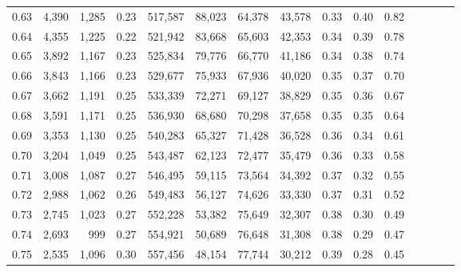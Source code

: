 \begin{tabular}{rrrcrrrrrrrrrrr}
0.63 &   4,390 &   1,285 &                                       0.23 &  517,587 &   88,023 &   64,378 &   43,578 &  0.33 &  0.40 &                         0.82 \\
0.64 &   4,355 &   1,225 &                                       0.22 &  521,942 &   83,668 &   65,603 &   42,353 &  0.34 &  0.39 &                         0.78 \\
0.65 &   3,892 &   1,167 &                                       0.23 &  525,834 &   79,776 &   66,770 &   41,186 &  0.34 &  0.38 &                         0.74 \\
0.66 &   3,843 &   1,166 &                                       0.23 &  529,677 &   75,933 &   67,936 &   40,020 &  0.35 &  0.37 &                         0.70 \\
0.67 &   3,662 &   1,191 &                                       0.25 &  533,339 &   72,271 &   69,127 &   38,829 &  0.35 &  0.36 &                         0.67 \\
0.68 &   3,591 &   1,171 &                                       0.25 &  536,930 &   68,680 &   70,298 &   37,658 &  0.35 &  0.35 &                         0.64 \\
0.69 &   3,353 &   1,130 &                                       0.25 &  540,283 &   65,327 &   71,428 &   36,528 &  0.36 &  0.34 &                         0.61 \\
0.70 &   3,204 &   1,049 &                                       0.25 &  543,487 &   62,123 &   72,477 &   35,479 &  0.36 &  0.33 &                         0.58 \\
0.71 &   3,008 &   1,087 &                                       0.27 &  546,495 &   59,115 &   73,564 &   34,392 &  0.37 &  0.32 &                         0.55 \\
0.72 &   2,988 &   1,062 &                                       0.26 &  549,483 &   56,127 &   74,626 &   33,330 &  0.37 &  0.31 &                         0.52 \\
0.73 &   2,745 &   1,023 &                                       0.27 &  552,228 &   53,382 &   75,649 &   32,307 &  0.38 &  0.30 &                         0.49 \\
0.74 &   2,693 &     999 &                                       0.27 &  554,921 &   50,689 &   76,648 &   31,308 &  0.38 &  0.29 &                         0.47 \\
0.75 &   2,535 &   1,096 &                                       0.30 &  557,456 &   48,154 &   77,744 &   30,212 &  0.39 &  0.28 &                         0.45 \\

\end{tabular}
